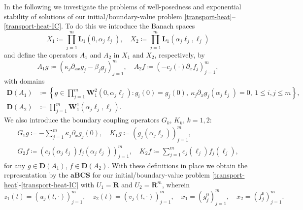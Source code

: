 \documentclass[a4paper,11pt,reqno]{amsart}
\def\ka{\kappa}
\def\R{\mathbf{R}}
\theoremstyle{plain}
\numberwithin{equation}{section}
\begin{document}
In the following we investigate the problems of well-posedness and exponential stability of solutions of our initial/boundary-value problem \eqref{transport-heat}--\eqref{transport-heat-IC}. To do this we introduce the Banach spaces
\begin{equation*}
X_1\coloneqq \prod_{j=1}^m \bm{L}_1(0,\alpha_j\ell_j),\quad X_2\coloneqq \prod_{j=1}^m \bm{L}_1(\alpha_j\ell_j,\ell_j)
\end{equation*}
and define the operators $A_1$ and $A_2$ in $X_1$ and $X_2$, respectively, by
\begin{equation}\label{system.operators}
A_1g\coloneqq (\kappa_j\partial_{xx}g_j-\beta_jg_j)_{j=1}^m,\quad 
A_2f\coloneqq (-c_j(\cdot)\partial_{x}f_j)_{j=1}^m,
\end{equation}
with domains 
\begin{equation}\label{system.operators_dom}
\begin{split}
{\bm D}(A_1)&\coloneqq \left\{g\in \prod_{j=1}^m \bm{W}_1^2(0,\alpha_j\ell_j):g_i(0)=g_j(0),~\ka_j\partial_{x}g_j(\alpha_j\ell_j)=0,~1 \le i,j\le m\right\},\\
{\bm D}(A_2)&\coloneqq \prod_{j=1}^m \bm{W}_1^1(\alpha_j\ell_j,\ell_j).
\end{split}
\end{equation}
We also introduce the boundary coupling operators $G_k$, $K_k$, $k=1,2$: 
\begin{equation}\label{eq:1}
\begin{gathered}
G_1g\coloneqq -\sum_{j=1}^{m}\ka_j\partial_{x}g_j(0),\quad K_1g\coloneqq (g_j(\alpha_j\ell_j))_{j=1}^m,\\
 G_2f\coloneqq (c_j(\alpha_j\ell_j)f_j(\alpha_j\ell_j))_{j=1}^m,\quad K_2f\coloneqq \sum_{j=1}^{m}c_j(\ell_j)f_j(\ell_j),
\end{gathered}
\end{equation}
for any $g\in {\bm D}(A_1)$, $f\in {\bm D}(A_2)$. With these definitions in place we obtain the representation by the $\mathbf{aBCS}$ for our initial/boundary-value problem \eqref{transport-heat}-\eqref{transport-heat-IC} with $U_1=\R$ and $U_2=\R^m$, wherein
\begin{equation*}
 z_1(t)= (u_j(t,\cdot))_{j=1}^m,\quad z_2(t)= (v_j(t,\cdot))_{j=1}^m, \quad x_1= (g_j^0)_{j=1}^m, \quad x_2= (f_j^0)_{j=1}^m.
\end{equation*}
\end{document}
